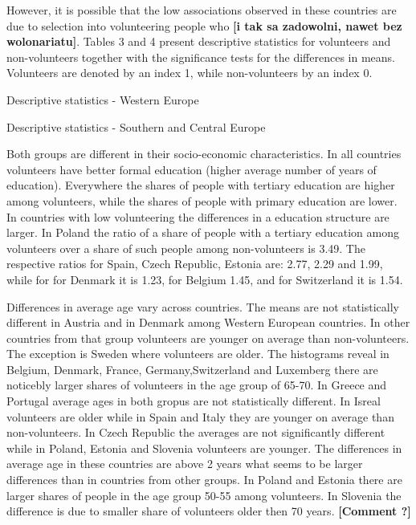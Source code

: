 \documentclass[10pt, letterpaper]{article}
\begin{document}
\begin{spacing}{1.4}
However, it is possible that the low associations observed in these countries are due to selection into volunteering people who \textbf{[i tak sa zadowolni, nawet bez wolonariatu]}. Tables 3 and 4 present descriptive statistics for volunteers and non-volunteers together with the significance tests for the differences in means. Volunteers are denoted by an index 1, while non-volunteers by an index 0.  \\


\begin{table}[H]
\begin{spacing}{.9}  
\centering 
 \caption{Descriptive statistics - Western Europe}
	 
      \label{DescT0WE} 
\end{spacing}
\end{table}


\begin{table}[H]
\begin{spacing}{.9}  
\centering 
 \caption{Descriptive statistics - Southern and Central Europe}
	 
      \label{DescT0CEE} 
\end{spacing}
\end{table}
Both groups are different in their socio-economic characteristics. In all countries volunteers have better formal education (higher average number of years of education). Everywhere the shares of people with tertiary education are higher among volunteers, while the shares of people with primary education are lower. In countries with low volunteering the differences in a education structure are larger. In Poland the ratio of a share of people with a tertiary  education among volunteers over a share of such people among non-volunteers is 3.49. The respective ratios for Spain, Czech Republic, Estonia are: 2.77, 2.29 and 1.99, while for for Denmark it is 1.23, for Belgium 1.45, and for Switzerland it is 1.54. 

Differences in average age vary across countries. The means are  not statistically different  in Austria and in Denmark among Western European countries. In other countries from that group volunteers are younger  on average than non-volunteers. The exception is Sweden where volunteers are older. The histograms reveal in Belgium, Denmark, France, Germany,Switzerland and Luxemberg there are noticebly larger shares of volunteers in the age group of 65-70. In Greece and Portugal average ages in both gropus are not statistically different. In Isreal volunteers are older while in Spain and Italy they are younger on average than non-volunteers. In Czech Republic the averages are not significantly different while in Poland, Estonia and Slovenia volunteers are younger. The differences in average age in these countries are above 2 years what seems to be larger differences than in countries from other groups. In Poland and Estonia there are larger shares of people in the age group 50-55 among volunteers.  In Slovenia the difference is due to smaller share of volunteers older then 70 years. \textbf{[Comment ?]}


\end{spacing}
\end{document}
